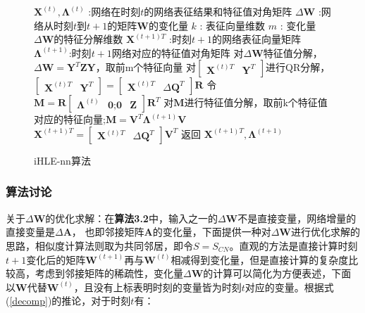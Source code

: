 \begin{figure}[htb]
	\centering
	\begin{minipage}{.7\linewidth}
		\begin{algorithm}[H]\label{iHLE_nn}
			\small
			\caption{iHLE-nn算法}
			\begin{algorithmic}[1]
				\Require
				\Statex $\textbf{X} ^{(t)},\bm{\Lambda}^{(t)}$ :网络在时刻$t$的网络表征结果和特征值对角矩阵
				\Statex $\Delta\textbf{W}$ :网络从时刻$t$到$t+1$的矩阵$\textbf{W}$的变化量
				\Statex $k$ : 表征向量维数
				\Statex $m$ : 变化量$\Delta\textbf{W}$的特征分解维数
				\Ensure
				\Statex $\textbf{X}^{(t+1)T}$ :时刻$t+1$的网络表征向量矩阵
				\Statex $\bm{\Lambda}^{(t+1)}$:时刻$t+1$网络对应的特征值对角矩阵
				\Statex
				\State 对$\Delta\textbf{W}$特征值分解，$\Delta\textbf{W} =  \textbf{Y}^{T} \textbf{Z}  \textbf{Y}$，取前m个特征向量
				\State 对$\begin{bmatrix} \textbf{X}^{(t)T} & \textbf{Y}^{T}\end{bmatrix}$进行QR分解，$\begin{bmatrix} \textbf{X}^{(t)T} & \textbf{Y}^{T}\end{bmatrix} = \begin{bmatrix} \textbf{X}^{(t)T} & \Delta\textbf{Q}^{T} \end{bmatrix} \textbf{R}$
				\State 令$\textbf{M} = \textbf{R}\begin{bmatrix}  \bm{\Lambda}^{(t)} & \textbf{0};
				\textbf{0} & \textbf{Z} \end{bmatrix}
				\textbf{R}^T$
				\State 对$\textbf{M}$进行特征值分解，取前k个特征值对应的特征向量;$\textbf{M} =\textbf{V}^T \bm{\Lambda}^{(t+1)} \textbf{V}$
				\State $\textbf{X}^{(t+1)T} = \begin{bmatrix} \textbf{X}^{(t)T} & \Delta\textbf{Q}^{T} \end{bmatrix} \textbf{V}^T$
				\State 返回 $\textbf{X}^{(t+1)T}, \bm{\Lambda}^{(t+1)}$
			\end{algorithmic}
		\end{algorithm}
	\end{minipage}
\end{figure}

\subsubsection{算法讨论}
 关于$\Delta\textbf{W}$的优化求解：在\textbf{算法3.2}中，输入之一的$\Delta\textbf{W}$不是直接变量，网络增量的直接变量是$\Delta\textbf{A}$， 也即邻接矩阵$\textbf{A}$的变化量，下面提供一种对$\Delta\textbf{W}$进行优化求解的思路，相似度计算法则取为共同邻居，即令$S=S_{CN}$。直观的方法是直接计算时刻$t+1$变化后的矩阵$\textbf{W}^{(t+1)}$再与$\textbf{W}^{(t)}$相减得到变化量，但是直接计算的复杂度比较高，考虑到邻接矩阵的稀疏性，变化量$\Delta\textbf{W}$的计算可以简化为方便表述，下面以$\textbf{W}$代替$\textbf{W}^{(t)}$，且没有上标表明时刻的变量皆为时刻$t$对应的变量。根据式(\ref{decomp})的推论，对于时刻$t$有：

